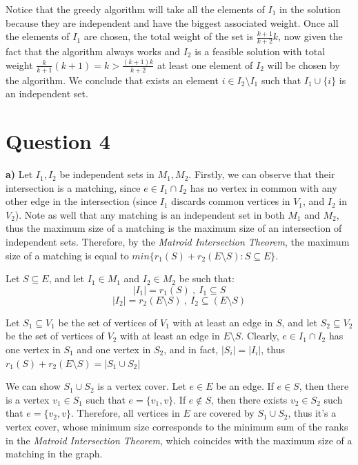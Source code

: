 \documentclass[12pt]{article}
\begin{document}
Notice that the greedy algorithm will take all the elements of $I_{1}$ in the solution because they are independent and have the biggest associated weight. Once all the elements of $I_{1}$ are chosen, the total weight of the set is $\frac{k+1}{k+2}k$, now given the fact that the algorithm always works and $I_{2}$ is a feasible solution with  total weight $\frac{k}{k+1}(k+1)=k>\frac{(k+1)k}{k+2}$ at least one element of $I_{2}$ will be chosen by the algorithm. We conclude that exists an element $i\in I_{2} \setminus I_{1}$ such that $I_{1} \cup \lbrace i \rbrace$ is an independent set.

\section{Question 4}

\textbf{a)} Let $I_{1}, I_{2}$ be independent sets in $M_{1}, M_{2}$. Firstly, we can observe that their intersection is a matching, since $e \in I_{1} \cap I_{2}$ has no vertex in common with any other edge in the intersection (since $I_{1}$ discards common vertices in $V_{1}$, and $I_{2}$ in $V_{2}$). Note as well that any matching is an independent set in both $M_{1}$ and $M_{2}$, thus the maximum size of a matching is the maximum size of an intersection of independent sets. Therefore, by the \textit{Matroid Intersection Theorem}, the maximum size of a matching is equal to $min \lbrace r_{1}(S) + r_{2}(E \setminus S) : S \subseteq E \rbrace$.

Let $S \subseteq E$, and let $I_{1} \in M_{1}$ and $I_{2} \in M_{2}$ be such that: $$|I_{1}| = r_{1}(S) \ , \ I_{1} \subseteq S$$ $$|I_{2}| = r_{2}(E \setminus S) \ , \ I_{2} \subseteq (E \setminus S)$$

Let $S_{1} \subseteq V_{1}$ be the set of vertices of $V_{1}$ with at least an edge in $S$, and let $S_{2} \subseteq V_{2}$ be the set of vertices of $V_{2}$ with at least an edge in $E \setminus S$. Clearly, $e \in I_{1} \cap I_{2}$ has one vertex in $S_{1}$ and one vertex in $S_{2}$, and in fact, $|S_{i}| = |I_{i}|$, thus $r_{1}(S) + r_{2}(E \setminus S) = |S_{1} \cup S_{2}|$

We can show $S_{1} \cup S_{2}$ is a vertex cover. Let $e \in E$ be an edge. If $e \in S$, then there is a vertex $v_{1} \in S_{1}$ such that $e = \lbrace v_{1}, v \rbrace$. If $e \notin S$, then there exists $v_{2} \in S_{2}$ such that $e = \lbrace v_{2}, v \rbrace$. Therefore, all vertices in $E$ are covered by $S_{1} \cup S_{2}$, thus it's a vertex cover, whose minimum size corresponds to the minimum sum of the ranks in the \textit{Matroid Intersection Theorem}, which coincides with the maximum size of a matching in the graph.
\end{document}
